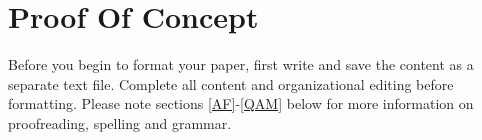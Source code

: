 \documentclass[conference]{IEEEtran}
\begin{document}
\section{Proof Of Concept}

Before you begin to format your paper, first write and save the content as a 
separate text file. Complete all content and organizational editing before 
formatting. Please note sections \ref{AF}-\ref{QAM} below for more information on 
proofreading, spelling and grammar.



\end{document}

